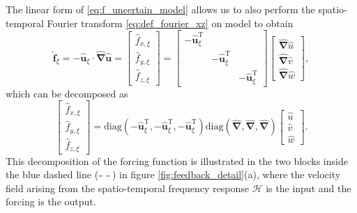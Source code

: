 The linear form of \eqref{eq:f_uncertain_model}  allows us to also  perform the spatio-temporal Fourier transform \eqref{eq:def_fourier_xz} on   model to obtain 
\begin{equation}
\label{eq:feedback_structured_uncertainty_1}
\boldsymbol{\widehat{f}}_{\xi}=-\boldsymbol{\widehat{u}}_{\xi}\cdot\boldsymbol{\widehat{\nabla}} \boldsymbol{\widehat{u}}=
\begin{bmatrix}
    \widehat{f}_{x,\xi}\\
    \widehat{f}_{y,\xi}\\
    \widehat{f}_{z,\xi}
    \end{bmatrix}=\begin{bmatrix}
    -\boldsymbol{\widehat{u}}_{\xi}^{\text{T}} & &\\
     & -\boldsymbol{\widehat{u}}_{\xi}^{\text{T}} & \\
      & & -\boldsymbol{\widehat{u}}_{\xi}^{\text{T}}
    \end{bmatrix}\begin{bmatrix}
\boldsymbol{\widehat{\nabla}}\widehat{u}\\
\boldsymbol{\widehat{\nabla}}\widehat{v}\\
\boldsymbol{\widehat{\nabla}}\widehat{w}
\end{bmatrix},
\end{equation}
which can be decomposed as
\begin{equation}
\begin{bmatrix}
    \widehat{f}_{x,\xi}\\
    \widehat{f}_{y,\xi}\\
    \widehat{f}_{z,\xi}
    \end{bmatrix}=\text{diag}\left(-\widehat{\boldsymbol{u}}_{\xi}^{\text{T}} ,-\widehat{\boldsymbol{u}}_{\xi}^{\text{T}},-\widehat{\boldsymbol{u}}_{\xi}^{\text{T}} \right)\text{diag}\left(\boldsymbol{\widehat{\nabla}},\boldsymbol{\widehat{\nabla}},\boldsymbol{\widehat{\nabla}}\right)\begin{bmatrix}
\widehat{u}\\
\widehat{v}\\
\widehat{w}
\end{bmatrix}.
\label{eq:feedback_structured_uncertainty}
\end{equation}
This decomposition of the forcing function is illustrated in the two blocks inside the blue dashed line ({\color{blue}$\dashed$}) in figure \ref{fig:feedback_detail}(a), where the velocity field arising from the spatio-temporal frequency response $\mathcal{H}$ is the input and the forcing is the output. 

